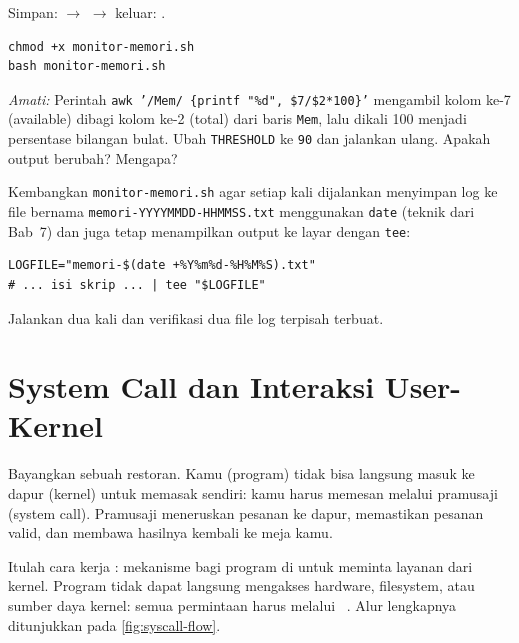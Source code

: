 \begin{notebox}
Simpan:  $\to$  $\to$ keluar: .
\end{notebox}

\begin{lstlisting}[caption={Jalankan skrip monitor}]
chmod +x monitor-memori.sh
bash monitor-memori.sh
\end{lstlisting}

\textit{Amati:} Perintah \texttt{awk '/Mem/ \{printf "\%d", \$7/\$2*100\}'} mengambil
kolom ke-7 (available) dibagi kolom ke-2 (total) dari baris \texttt{Mem}, lalu dikali
100 menjadi persentase bilangan bulat. Ubah \texttt{THRESHOLD} ke \texttt{90} dan
jalankan ulang. Apakah output berubah? Mengapa?

\begin{challengebox}
Kembangkan \texttt{monitor-memori.sh} agar setiap kali dijalankan menyimpan log
ke file bernama \texttt{memori-YYYYMMDD-HHMMSS.txt} menggunakan \texttt{date}
(teknik dari Bab~7) dan juga tetap menampilkan output ke layar dengan \texttt{tee}:
\begin{lstlisting}
LOGFILE="memori-$(date +%Y%m%d-%H%M%S).txt"
# ... isi skrip ... | tee "$LOGFILE"
\end{lstlisting}
Jalankan dua kali dan verifikasi dua file log terpisah terbuat.
\end{challengebox}

\section{System Call dan Interaksi User-Kernel}

Bayangkan sebuah restoran. Kamu (program) tidak bisa langsung masuk ke dapur (kernel)
untuk memasak sendiri: kamu harus memesan melalui pramusaji (system call).
Pramusaji meneruskan pesanan ke dapur, memastikan pesanan valid, dan membawa hasilnya
kembali ke meja kamu.

Itulah cara kerja : mekanisme bagi program di  untuk
meminta layanan dari kernel. Program tidak dapat langsung mengakses hardware,
filesystem, atau sumber daya kernel: semua permintaan harus melalui ~\cite{posix2018, love2010linux, bovet2005understanding}.
Alur lengkapnya ditunjukkan pada \cref{fig:syscall-flow}.

